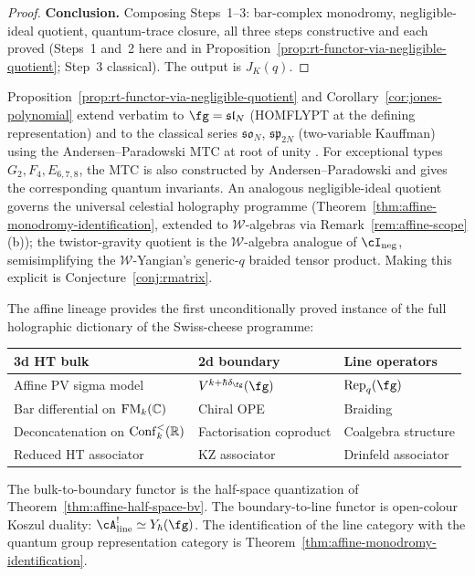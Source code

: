 \begin{proof}
\medskip
\noindent\textbf{Conclusion.}
Composing Steps~1--3: bar-complex monodromy, negligible-ideal quotient, quantum-trace closure, all three steps constructive and each proved (Steps~1 and~2 here and in Proposition~\ref{prop:rt-functor-via-negligible-quotient}; Step~3 classical). The output is $J_K(q)$.
\end{proof}

\begin{remark}
\label{rem:rt-scope}
Proposition~\ref{prop:rt-functor-via-negligible-quotient} and Corollary~\ref{cor:jones-polynomial} extend verbatim to $\fg = \mathfrak{sl}_N$ (HOMFLYPT at the defining representation) and to the classical series $\mathfrak{so}_N$, $\mathfrak{sp}_{2N}$ (two-variable Kauffman) using the Andersen--Paradowski MTC at root of unity \cite{AP95}. For exceptional types $G_2, F_4, E_{6,7,8}$, the MTC is also constructed by Andersen--Paradowski and gives the corresponding quantum invariants. An analogous negligible-ideal quotient governs the universal celestial holography programme (Theorem~\ref{thm:affine-monodromy-identification}, extended to $\mathcal{W}$-algebras via Remark~\ref{rem:affine-scope}(b)); the twistor-gravity quotient is the $\mathcal{W}$-algebra analogue of $\cI_{\mathrm{neg}}$, semisimplifying the $\mathcal{W}$-Yangian's generic-$q$ braided tensor product. Making this explicit is Conjecture~\ref{conj:rmatrix}.
\end{remark}

\begin{corollary}
\label{cor:holographic-dictionary}
The affine lineage provides the first unconditionally proved instance of the full holographic dictionary of the Swiss-cheese programme:
\begin{center}
\renewcommand{\arraystretch}{1.3}
\begin{tabular}{lll}
\textbf{3d HT bulk} & \textbf{2d boundary} & \textbf{Line operators} \\
\hline
Affine PV sigma model & $V^{k+\hbar\delta_\fg}(\fg)$ & $\mathrm{Rep}_q(\fg)$ \\
Bar differential on $\mathrm{FM}_k(\mathbb C)$ & Chiral OPE & Braiding \\
Deconcatenation on $\mathrm{Conf}_k^<(\mathbb R)$ & Factorisation coproduct & Coalgebra structure \\
Reduced HT associator & KZ associator & Drinfeld associator \\
\end{tabular}
\end{center}
The bulk-to-boundary functor is the half-space quantization of Theorem~\textup{\ref{thm:affine-half-space-bv}}. The boundary-to-line functor is open-colour Koszul duality: $\cA^!_{\mathrm{line}} \simeq Y_\hbar(\fg)$. The identification of the line category with the quantum group representation category is Theorem~\textup{\ref{thm:affine-monodromy-identification}}.
\end{corollary}

